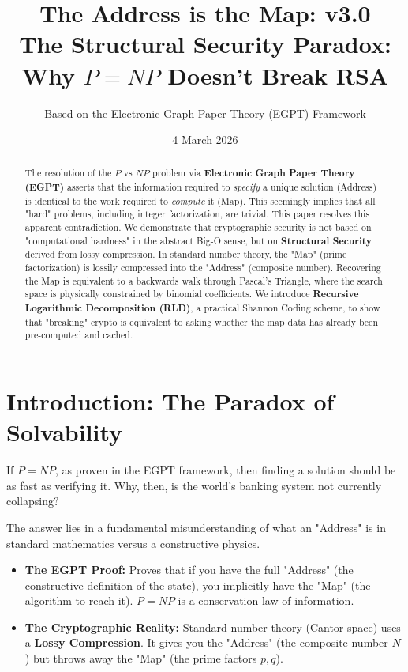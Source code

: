 \documentclass[11pt, a4paper]{article}
\title{\textbf{The Address is the Map: v3.0}\\
\large The Structural Security Paradox: Why $P=NP$ Doesn't Break RSA}
\author{Based on the Electronic Graph Paper Theory (EGPT) Framework}
\date{4 March 2026}
\begin{document}
\maketitle

\begin{abstract}
The resolution of the $P$ vs $NP$ problem via \textbf{Electronic Graph Paper Theory (EGPT)} asserts that the information required to \textit{specify} a unique solution (Address) is identical to the work required to \textit{compute} it (Map). This seemingly implies that all "hard" problems, including integer factorization, are trivial. This paper resolves this apparent contradiction. We demonstrate that cryptographic security is not based on "computational hardness" in the abstract Big-O sense, but on \textbf{Structural Security} derived from lossy compression. In standard number theory, the "Map" (prime factorization) is lossily compressed into the "Address" (composite number). Recovering the Map is equivalent to a backwards walk through Pascal's Triangle, where the search space is physically constrained by binomial coefficients. We introduce \textbf{Recursive Logarithmic Decomposition (RLD)}, a practical Shannon Coding scheme, to show that "breaking" crypto is equivalent to asking whether the map data has already been pre-computed and cached.
\end{abstract}

\section{Introduction: The Paradox of Solvability}

If $P=NP$, as proven in the EGPT framework, then finding a solution should be as fast as verifying it. Why, then, is the world's banking system not currently collapsing?

The answer lies in a fundamental misunderstanding of what an "Address" is in standard mathematics versus a constructive physics.
\begin{itemize}
    \item \textbf{The EGPT Proof:} Proves that if you have the full "Address" (the constructive definition of the state), you implicitly have the "Map" (the algorithm to reach it). $P=NP$ is a conservation law of information.
    \item \textbf{The Cryptographic Reality:} Standard number theory (Cantor space) uses a \textbf{Lossy Compression}. It gives you the "Address" (the composite number $N$) but throws away the "Map" (the prime factors $p, q$).
\end{itemize}
\end{document}
